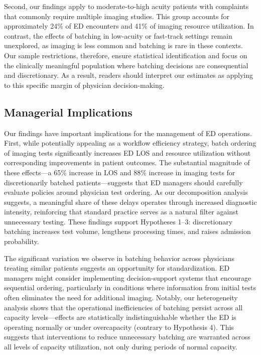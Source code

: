 \documentclass[,,blindrev]{informs}
\begin{document}
Second, our findings apply to moderate-to-high acuity patients with
complaints that commonly require multiple imaging studies. This group
accounts for approximately 24\% of ED encounters and 41\% of imaging
resource utilization. In contrast, the effects of batching in low-acuity
or fast-track settings remain unexplored, as imaging is less common and
batching is rare in these contexts. Our sample restrictions, therefore,
ensure statistical identification and focus on the clinically meaningful
population where batching decisions are consequential and discretionary.
As a result, readers should interpret our estimates as applying to this
specific margin of physician decision-making.

\subsection{Managerial Implications}\label{sec:implications}

Our findings have important implications for the management of ED
operations. First, while potentially appealing as a workflow efficiency
strategy, batch ordering of imaging tests significantly increases ED LOS
and resource utilization without corresponding improvements in patient
outcomes. The substantial magnitude of these effects---a 65\% increase
in LOS and 88\% increase in imaging tests for discretionarily batched
patients---suggests that ED managers should carefully evaluate policies
around physician test ordering. As our decomposition analysis suggests,
a meaningful share of these delays operates through increased diagnostic
intensity, reinforcing that standard practice serves as a natural filter
against unnecessary testing. These findings support Hypotheses 1--3:
discretionary batching increases test volume, lengthens processing
times, and raises admission probability.

The significant variation we observe in batching behavior across
physicians treating similar patients suggests an opportunity for
standardization. ED managers might consider implementing
decision-support systems that encourage sequential ordering,
particularly in conditions where information from initial tests often
eliminates the need for additional imaging. Notably, our heterogeneity
analysis shows that the operational inefficiencies of batching persist
across all capacity levels---effects are statistically indistinguishable
whether the ED is operating normally or under overcapacity (contrary to
Hypothesis 4). This suggests that interventions to reduce unnecessary
batching are warranted across all levels of capacity utilization, not
only during periods of normal capacity.
\end{document}
